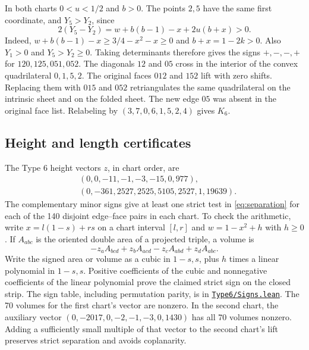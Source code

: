 \documentclass[11pt,letterpaper]{amsart}
\newcommand{\release}{bd3a0e03908481d738df30233cf95c641a1d3f71}
\newcommand{\src}[2]{\href{https://github.com/vltanh/lean4-origami-torus/blob/\release/#1}{\texttt{#2}}}
\begin{document}
In both charts \(0<u<1/2\) and \(b>0\). The points \(2,5\) have the
same first coordinate, and \(Y_5>Y_2\), since
\[
 2(Y_5-Y_2)=w+b(b-1)-x+2u(b+x)>0.
\]
Indeed, \(w+b(b-1)-x\ge 3/4-x^2-x\ge0\) and \(b+x=1-2k>0\).
Also \(Y_1>0\) and \(Y_5>Y_2\ge0\). Taking determinants therefore
gives the signs \(+,-,-,+\) for \(120,125,051,052\).
The diagonals \(12\) and \(05\) cross in the interior of
the convex quadrilateral \(0,1,5,2\). The original faces \(012\)
and \(152\) lift with zero shifts. Replacing them with \(015\) and
\(052\) retriangulates the same quadrilateral on the intrinsic
sheet and on the folded sheet. The new edge \(05\) was absent in the
original face list. Relabeling by \((3,7,0,6,1,5,2,4)\) gives \(K_6\).

\subsection*{Height and length certificates}

The Type \(6\) height vectors \(z\), in chart order, are
\[
 \begin{aligned}
 &(0,0,-11,-1,-3,-15,0,977),\\
 &(0,-361,2527,2525,5105,2527,1,19639).
 \end{aligned}
\]
The complementary minor signs give at least one strict test in
\eqref{eq:separation} for each of the 140 disjoint edge--face pairs
in each chart. To check the arithmetic, write
\(x=l(1-s)+rs\) on a chart interval \([l,r]\) and
\(w=1-x^2+h\) with \(h\ge0\). If \(A_{abc}\) is the oriented
double area of a projected triple, a volume is
\[
 -z_a A_{bcd}+z_b A_{acd}-z_c A_{abd}+z_d A_{abc}.
\]
Write the signed area or volume as a cubic in \(1-s,s\), plus
\(h\) times a linear polynomial in \(1-s,s\). Positive coefficients
of the cubic and nonnegative coefficients of the linear polynomial
prove the claimed strict sign on the closed strip. The sign table,
including permutation parity, is in
\src{OrigamiTorus/EightVertex/Type6/Signs.lean}{Type6/Signs.lean}.
The 70 volumes for the first chart's vector are nonzero.
In the second chart, the auxiliary vector
\((0,-2017,0,-2,-1,-3,0,1430)\) has all 70 volumes nonzero.
Adding a sufficiently small multiple of that vector to the second
chart's lift preserves strict separation and avoids coplanarity.
\end{document}
